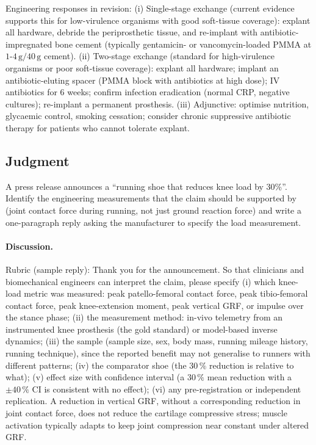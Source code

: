 Engineering responses in revision:
(i) Single-stage exchange (current evidence supports this for
low-virulence organisms with good soft-tissue coverage): explant
all hardware, debride the periprosthetic tissue, and re-implant with
antibiotic-impregnated bone cement (typically gentamicin- or
vancomycin-loaded PMMA at $1$-$4\,\text{g}/40\,\text{g}$ cement).
(ii) Two-stage exchange (standard for high-virulence organisms or
poor soft-tissue coverage): explant all hardware; implant an
antibiotic-eluting spacer (PMMA block with antibiotics at high dose);
IV antibiotics for $6$ weeks; confirm infection eradication
(normal CRP, negative cultures); re-implant a permanent prosthesis.
(iii) Adjunctive: optimise nutrition, glycaemic control, smoking
cessation; consider chronic suppressive antibiotic therapy for
patients who cannot tolerate explant.

\subsection*{Judgment}

\begin{exercise}
A press release announces a ``running shoe that reduces knee load
by 30\%''. Identify the engineering measurements that the claim
should be supported by (joint contact force during running, not just
ground reaction force) and write a one-paragraph reply asking the
manufacturer to specify the load measurement.
\end{exercise}

\paragraph{Discussion.}
Rubric (sample reply): Thank you for the announcement. So that
clinicians and biomechanical engineers can interpret the claim,
please specify (i) which knee-load metric was measured: peak
patello-femoral contact force, peak tibio-femoral contact force,
peak knee-extension moment, peak vertical GRF, or impulse over the
stance phase; (ii) the measurement method: in-vivo telemetry from an
instrumented knee prosthesis (the gold standard) or model-based
inverse dynamics; (iii) the sample (sample size, sex, body mass,
running mileage history, running technique), since the reported
benefit may not generalise to runners with different patterns;
(iv) the comparator shoe (the $30\,\%$ reduction is relative to
what); (v) effect size with confidence interval (a $30\,\%$ mean
reduction with a $\pm 40\,\%$ CI is consistent with no effect);
(vi) any pre-registration or independent replication. A reduction
in vertical GRF, without a corresponding reduction in joint contact
force, does not reduce the cartilage compressive stress; muscle
activation typically adapts to keep joint compression near constant
under altered GRF.

